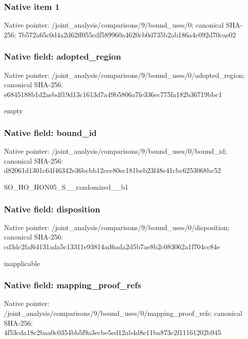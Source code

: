 \documentclass[10pt,a4paper]{article}
\begin{document}
\subsubsection{Native item 1}
Native pointer: /joint\_\allowbreak{}analysis/comparisons/9/bound\_\allowbreak{}uses/0; canonical SHA-256: 7b572a65c0d4a2d62ff055cdf589960a4620cb0d735b2ab186a4c092d70cae02

\subsubsection{Native field: adopted\_\allowbreak{}region}
Native pointer: /joint\_\allowbreak{}analysis/comparisons/9/bound\_\allowbreak{}uses/0/adopted\_\allowbreak{}region; canonical SHA-256: e6845188b1d2aebdf19d13c1613d7a49b5806a7fe336ec775fa182b36719bbc1

\begingroup\raggedright\sloppy empty\par\endgroup

\subsubsection{Native field: bound\_\allowbreak{}id}
Native pointer: /joint\_\allowbreak{}analysis/comparisons/9/bound\_\allowbreak{}uses/0/bound\_\allowbreak{}id; canonical SHA-256: d82061d1301c64f46342e36bcbb12cec80ec181beb23f48e41cbc6253068bc52

\begingroup\raggedright\sloppy SO\_\allowbreak{}HO\_\allowbreak{}HON05\_\allowbreak{}S\_\allowbreak{}\_\allowbreak{}randomized\_\allowbreak{}\_\allowbreak{}b1\par\endgroup

\subsubsection{Native field: disposition}
Native pointer: /joint\_\allowbreak{}analysis/comparisons/9/bound\_\allowbreak{}uses/0/disposition; canonical SHA-256: cd3dc2faf64131ada5c13311e93814ad6ada2d5b7ae8b2c083062a1f704cc84e

\begingroup\raggedright\sloppy inapplicable\par\endgroup

\subsubsection{Native field: mapping\_\allowbreak{}proof\_\allowbreak{}refs}
Native pointer: /joint\_\allowbreak{}analysis/comparisons/9/bound\_\allowbreak{}uses/0/mapping\_\allowbreak{}proof\_\allowbreak{}refs; canonical SHA-256: 4f53cda18c2baa0c0354bb5f9a3ecbe5ed12ab4d8e11ba873c2f11161202b945
\end{document}
